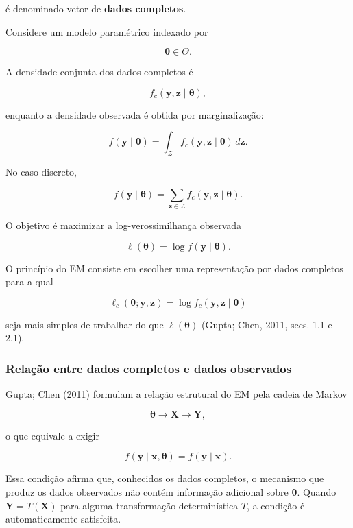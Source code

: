 \documentclass[
  letterpaper,
  DIV=11,
  numbers=noendperiod]{scrreprt}
\begin{document}
é denominado vetor de \textbf{dados completos}.

Considere um modelo paramétrico indexado por

\[\boldsymbol{\theta}\in\Theta.\]

A densidade conjunta dos dados completos é

\[f_c(\boldsymbol{y},\boldsymbol{z}\mid\boldsymbol{\theta}),\]

enquanto a densidade observada é obtida por marginalização:

\[f(\boldsymbol{y}\mid\boldsymbol{\theta})
=
\int_{\mathcal{Z}}
f_c(\boldsymbol{y},\boldsymbol{z}\mid\boldsymbol{\theta})
\,d\boldsymbol{z}.\]

No caso discreto,

\[f(\boldsymbol{y}\mid\boldsymbol{\theta})
=
\sum_{\boldsymbol{z}\in\mathcal{Z}}
f_c(\boldsymbol{y},\boldsymbol{z}\mid\boldsymbol{\theta}).\]

O objetivo é maximizar a log-verossimilhança observada

\[\ell(\boldsymbol{\theta})
=
\log f(\boldsymbol{y}\mid\boldsymbol{\theta}).\]

O princípio do EM consiste em escolher uma representação por dados
completos para a qual

\[\ell_c(\boldsymbol{\theta};\boldsymbol{y},\boldsymbol{z})
=
\log f_c(\boldsymbol{y},\boldsymbol{z}\mid\boldsymbol{\theta})\]

seja mais simples de trabalhar do que \(\ell(\boldsymbol{\theta})\)
(Gupta; Chen, 2011, secs. 1.1 e 2.1).

\subsubsection{Relação entre dados completos e dados
observados}\label{relauxe7uxe3o-entre-dados-completos-e-dados-observados}

Gupta; Chen (2011) formulam a relação estrutural do EM pela cadeia de
Markov

\[\boldsymbol{\theta}\longrightarrow\boldsymbol{X}\longrightarrow\boldsymbol{Y},\]

o que equivale a exigir

\[f(\boldsymbol{y}\mid\boldsymbol{x},\boldsymbol{\theta})
=
f(\boldsymbol{y}\mid\boldsymbol{x}).\]

Essa condição afirma que, conhecidos os dados completos, o mecanismo que
produz os dados observados não contém informação adicional sobre
\(\boldsymbol{\theta}\). Quando \(\boldsymbol{Y}=T(\boldsymbol{X})\)
para alguma transformação determinística \(T\), a condição é
automaticamente satisfeita.
\end{document}
